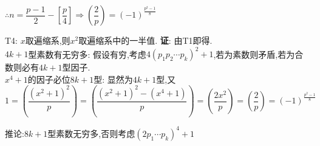 $ \therefore n = \dfrac{p-1}{2}-[ \dfrac{p}{4}] \Rightarrow ( \dfrac{2}{p}) = (-1)^{\frac{p^2-1}{8}}$

T4: $ x$取遍缩系,则$ x^2$取遍缩系中的一半值.
{\bf 证}: 由T1即得.
\\

$ 4k+1$型素数有无穷多: 假设有穷,考虑$ 4(p_1 p_2 \cdots p_k)^2 + 1$,若为素数则矛盾,若为合数则必有$ 4k+1$型因子.
\\

$ x^4+1$的因子必位$ 8k+1$型: 显然为$ 4k+1$型,又$ 1 = (\dfrac{(x^2+1)^2}{p}) =
(\dfrac{(x^2+1)^2 - (x^4+1)}{p}) = (\dfrac{2x^2}{p}) = (\dfrac{2}{p}) = (-1)^{\frac{p^2-1}{8}}$

推论:$ 8k+1$型素数无穷多,否则考虑$ (2p_1\cdots p_k)^4 +1$
